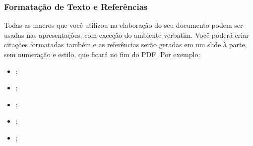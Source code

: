 \begin{frame}

    \frametitle{Formatação de Texto e Referências}
    
    Todas as macros que você utilizou na elaboração do seu documento podem ser usadas nas apresentações, com exceção do ambiente verbatim. Você poderá criar citações formatadas também e as referências serão geradas em um slide à parte, sem numeração e estilo, que ficará no fim do PDF. Por exemplo:
    
    \begin{itemize}
        \item \cite{Abedi2014, Agaisse1995};
        \item \cite{AgapitoTenfen2014, BtNomenclature2016, elson2014};
        \item {};
        \item {};
        \item {};
    \end{itemize}
         
\end{frame}
